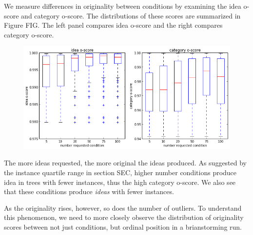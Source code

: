 We measure differences in originality between conditions by examining the idea o-score and category o-score. The distributions of these scores are summarized in Figure FIG. The left panel compares idea o-score and the right compares category o-score.







\begin{figure}[h!]
    \centering
    \includegraphics[width=0.9\columnwidth]{oscores_conditions}
\end{figure}

The more ideas requested, the more original the ideas produced. As suggested by the instance quartile range in section SEC, higher number conditions produce idea in trees with fewer instances, thus the high category o-score. We also see that these conditions produce \emph{ideas} with fewer instances.

As the originality rises, however, so does the number of outliers. To understand this phenomenon, we need to more closely observe the distribution of originality scores between not just conditions, but ordinal position in a brianstorming run.

